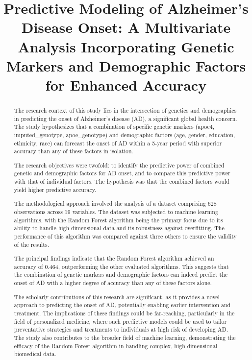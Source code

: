 \documentclass[conference]{IEEEtran}
\begin{document}
\title{Predictive Modeling of Alzheimer's Disease Onset: A Multivariate Analysis Incorporating Genetic Markers and Demographic Factors for Enhanced Accuracy}

\author{
}

\maketitle

\begin{abstract}
The research context of this study lies in the intersection of genetics and demographics in predicting the onset of Alzheimer's disease (AD), a significant global health concern. The study hypothesizes that a combination of specific genetic markers (apoe4, imputed_genotype, apoe_genotype) and demographic factors (age, gender, education, ethnicity, race) can forecast the onset of AD within a 5-year period with superior accuracy than any of these factors in isolation.

The research objectives were twofold: to identify the predictive power of combined genetic and demographic factors for AD onset, and to compare this predictive power with that of individual factors. The hypothesis was that the combined factors would yield higher predictive accuracy.

The methodological approach involved the analysis of a dataset comprising 628 observations across 19 variables. The dataset was subjected to machine learning algorithms, with the Random Forest algorithm being the primary focus due to its ability to handle high-dimensional data and its robustness against overfitting. The performance of this algorithm was compared against three others to ensure the validity of the results.

The principal findings indicate that the Random Forest algorithm achieved an accuracy of 0.464, outperforming the other evaluated algorithms. This suggests that the combination of genetic markers and demographic factors can indeed predict the onset of AD with a higher degree of accuracy than any of these factors alone.

The scholarly contributions of this research are significant, as it provides a novel approach to predicting the onset of AD, potentially enabling earlier intervention and treatment. The implications of these findings could be far-reaching, particularly in the field of personalized medicine, where such predictive models could be used to tailor preventative strategies and treatments to individuals at high risk of developing AD. The study also contributes to the broader field of machine learning, demonstrating the efficacy of the Random Forest algorithm in handling complex, high-dimensional biomedical data.
\end{abstract}
\end{document}
